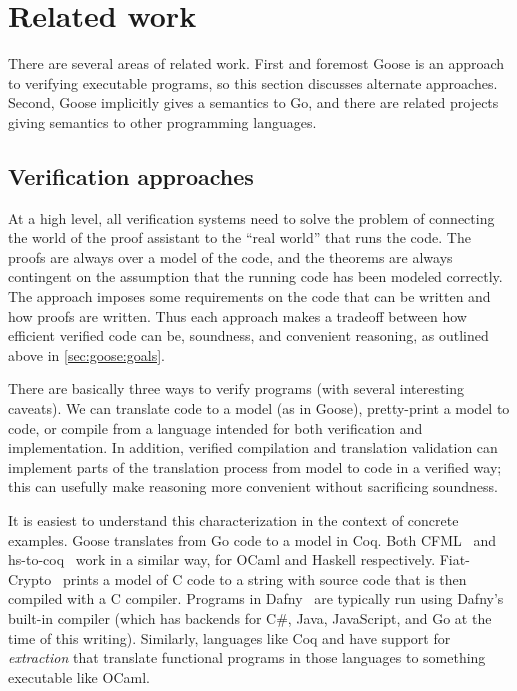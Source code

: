 \section{Related work}%
\label{sec:goose:rel-work}

There are several areas of related work. First and foremost Goose is an approach
to verifying executable programs, so this section discusses alternate
approaches. Second, Goose implicitly gives a semantics to Go, and there are
related projects giving semantics to other programming languages.

\subsection{Verification approaches}

At a high level, all verification systems need to solve the problem of
connecting the world of the proof assistant to the ``real world'' that runs the
code. The proofs are always over a model of the code, and the theorems are
always contingent on the assumption that the running code has been modeled correctly. The approach
imposes some requirements on the code that can be written and how proofs are
written. Thus each approach makes a tradeoff between how efficient verified code
can be, soundness, and
convenient reasoning, as outlined above in \cref{sec:goose:goals}.

There are basically three ways to verify programs (with several interesting
caveats). We can translate code to a model (as in Goose), pretty-print a
model to code, or compile from a language intended for both verification and
implementation. In addition, verified compilation and translation validation can
implement parts of the translation process from model to code in a verified way;
this can usefully make reasoning more convenient without sacrificing soundness.

It is easiest to understand this characterization in the context of concrete
examples. Goose translates from Go code to a model in Coq. Both
CFML~\cite{chargueraud:cfml} and hs-to-coq~\cite{spector-zabusky:hstocoq} work
in a similar way, for OCaml and Haskell respectively.
Fiat-Crypto~\cite{erbsen:fiat-crypto} prints a model of C code to a string with
source code that
is then compiled with a C compiler. Programs in Dafny~\cite{leino:dafny} are
typically run using Dafny's built-in compiler (which has backends for C\#, Java,
JavaScript, and Go at the time of this writing). Similarly, languages like Coq
and \fstar have support for \emph{extraction} that translate functional programs
in those languages to something executable like OCaml.

